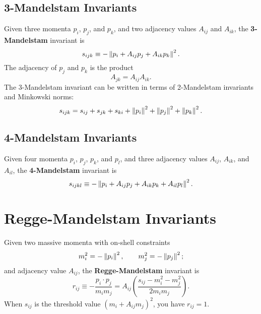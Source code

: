 \subsection{3-Mandelstam Invariants}
Given three momenta $p_{i}$, $p_{j}$, and $p_{k}$, and two adjacency values $A_{ij}$ and $A_{ik}$, the \textbf{3-Mandelstam} invariant is
\begin{equation}
	s_{ijk} \equiv -\left\Vert p_{i} + A_{ij} p_{j} + A_{ik} p_{k} \right\Vert^{2}.
\end{equation}
The adjacency of $p_{j}$ and $p_{k}$ is the product
\begin{equation}
	A_{jk} = A_{ij} A_{ik}.
\end{equation}
The 3-Mandelstam invariant can be written in terms of 2-Mandelstam invariants and Minkowski norms:
\begin{equation}
	s_{ijk} = s_{ij} + s_{jk} + s_{ki} + \left\Vert p_{i} \right\Vert^{2} + \left\Vert p_{j} \right\Vert^{2} + \left\Vert p_{k} \right\Vert^{2}.
\end{equation}
\subsection{4-Mandelstam Invariants}
Given four momenta $p_{i}$, $p_{j}$, $p_{k}$, and $p_{l}$, and three adjacency values $A_{ij}$, $A_{ik}$, and $A_{il}$, the \textbf{4-Mandelstam} invariant is
\begin{equation}
	s_{ijkl} \equiv -\left\Vert p_{i} + A_{ij} p_{j} + A_{ik} p_{k} + A_{il} p_{l} \right\Vert^{2}.
\end{equation}
\section{Regge-Mandelstam Invariants}
Given two massive momenta with on-shell constraints
\begin{equation}
	m_{i}^{2} = -\left\Vert p_{i} \right\Vert^{2}, \qquad m_{j}^{2} = -\left\Vert p_{j} \right\Vert^{2};
\end{equation}
and adjacency value $A_{ij}$, the \textbf{Regge-Mandelstam} invariant is
\begin{equation}
	r_{ij} \equiv -\frac{p_{i} \cdot p_{j}}{m_{i} m_{j}} = A_{ij} \left( \frac{s_{ij} - m_{i}^{2} - m_{j}^{2}}{2 m_{i} m_{j}} \right).
\end{equation}
When $s_{ij}$ is the threshold value $\left( m_{i} + A_{ij} m_{j} \right)^{2}$, you have $r_{ij} = 1$.
